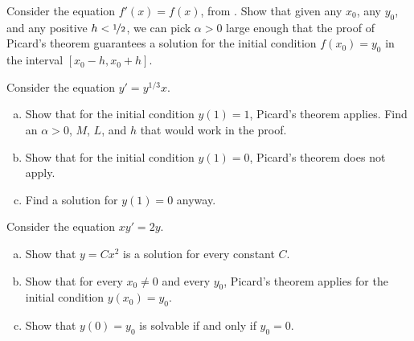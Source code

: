 \begin{exercise}
Consider the equation $f'(x) = f(x)$,
from .  Show that given any $x_0$,
any $y_0$, and any positive $h < \nicefrac{1}{2}$, we can pick $\alpha >
0$ large enough that the proof of Picard's theorem guarantees a solution
for the initial condition $f(x_0) = y_0$ in the interval
$[x_0-h,x_0+h]$.
\end{exercise}

\begin{exercise}
\pagebreak[3]
Consider the equation $y' = y^{1/3}x$.
\begin{enumerate}[a)]
\item
Show that for the initial condition $y(1)=1$, Picard's theorem applies.
Find an $\alpha > 0$, $M$, $L$, and $h$ that would work in the proof.
\item
Show that for the initial condition $y(1) = 0$, Picard's theorem
does not apply.
\item
Find a solution for $y(1) = 0$ anyway.
\end{enumerate}
\end{exercise}

\begin{exercise}
Consider the equation $x y' = 2y$.
\begin{enumerate}[a)]
\item
Show that $y = Cx^2$ is a solution for every constant $C$.
\item
Show that for every $x_0 \neq 0$ and every $y_0$, Picard's
theorem applies for the initial condition $y(x_0) = y_0$.
\item
Show that $y(0) = y_0$ is solvable if and only if $y_0 = 0$.
\end{enumerate}
\end{exercise}
